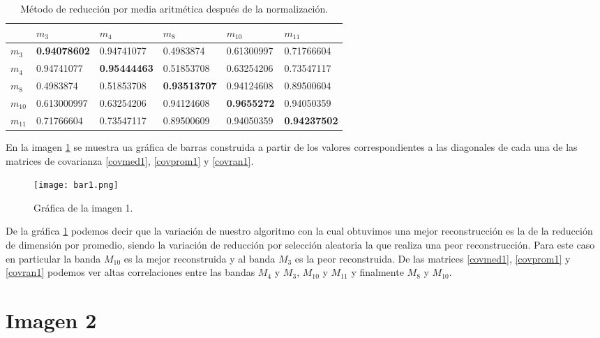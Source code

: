 \hfill

\begin{table}[ht!]
\begin{center}
\begin{tabular}{| p{2cm} | p{2cm} | p{2cm} | p{2cm} | p{2cm} | p{2cm} |}
\hline
 & $m_{3}$ & $m_{4}$ & $m_{8}$ & $m_{10}$ & $m_{11}$ \\
\hline
$m_{3}$ & \bf{0.94078602} & 0.94741077 & 0.4983874 & 0.61300997 & 0.71766604\\
\hline
$m_{4}$ & 0.94741077 & \bf{0.95444463} & 0.51853708 & 0.63254206 & 0.73547117\\
\hline
$m_{8}$ & 0.4983874 & 0.51853708 & \bf{0.93513707} & 0.94124608 & 0.89500604\\
\hline 
$m_{10}$ & 0.613000997 & 0.63254206 & 0.94124608 & \bf{0.9655272} & 0.94050359\\
\hline
$m_{11}$ & 0.71766604 & 0.73547117 & 0.89500609 & 0.94050359 & \bf{0.94237502}\\
\hline
\end{tabular}
\end{center} 	
\caption{Método de reducción por media aritmética después de la normalización.} \label{covpromnorm1} 
\end{table}


En la imagen \ref{bar1} se muestra ua gráfica de barras construida a partir de los valores correspondientes a las diagonales de cada una de las matrices de covarianza \ref{covmed1}, \ref{covprom1} y \ref{covran1}.

\begin{figure}
\centering
\texttt{[image: bar1.png]}
\caption{Gráfica de la imagen 1.}
\label{bar1}
\end{figure}


De la gráfica \ref{bar1} podemos decir que la variación de nuestro algoritmo con la cual obtuvimos una mejor reconstrucción es la de la reducción de dimensión por promedio, siendo la variación de reducción por selección aleatoria la que realiza una peor reconstrucción. Para este caso en particular la banda $M_{10}$ es la mejor reconstruida y al banda $M_{3}$ es la peor reconstruida. De las matrices \ref{covmed1}, \ref{covprom1} y \ref{covran1} podemos ver altas correlaciones entre las bandas $M_{4}$ y $M_{3}$, $M_{10}$ y $M_{11}$ y finalmente $M_{8}$ y $M_{10}$.

\newpage

\section{Imagen 2}

